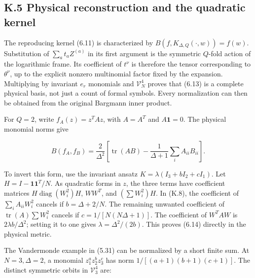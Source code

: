 \documentclass[a4paper,11pt]{article}
\numberwithin{equation}{section}
\begin{document}
\hypertarget{k.5-physical-reconstruction-and-the-quadratic-kernel}{%
\subsection{K.5 Physical reconstruction and the quadratic kernel}\label{k.5-physical-reconstruction-and-the-quadratic-kernel}}

The reproducing kernel (6.11) is characterized by \(B(f,K_{\Delta,Q}(\cdot,w))=f(w)\). Substitution of \(\sum_at_aZ^{(a)}\) in its first argument is the symmetric \(Q\)-fold action of the logarithmic frame. Its coefficient of \(t^\nu\) is therefore the tensor corresponding to \(\theta^\nu\), up to the explicit nonzero multinomial factor fixed by the expansion. Multiplying by invariant \(e_r\) monomials and \(\mathcal V_N^4\) proves that (6.13) is a complete physical basis, not just a count of formal symbols. Every normalization can then be obtained from the original Bargmann inner product.

For \(Q=2\), write \(f_A(z)=z^TAz\), with \(A=A^T\) and \(A\mathbf1=0\). The physical monomial norms give

\[
B(f_A,f_B)=\frac2{\Delta^2}
\left[\operatorname{tr}(AB)-\frac1{\Delta+1}\sum_iA_{ii}B_{ii}\right].
\tag{K.8}
\]

To invert this form, use the invariant ansatz \(K=\lambda(I_3+bI_2+cI_1)\). Let \(H=I-\mathbf1\mathbf1^T/N\). As quadratic forms in \(z\), the three terms have coefficient matrices \(H\operatorname{diag}(W_i^2)H\), \(WW^T\), and \((\sum W_i^2)H\). In (K.8), the coefficient of \(\sum_iA_{ii}W_i^2\) cancels if \(b=\Delta+2/N\). The remaining unwanted coefficient of \(\operatorname{tr}(A)\sum W_i^2\) cancels if \(c=1/[N(N\Delta+1)]\). The coefficient of \(W^TAW\) is \(2\lambda b/\Delta^2\); setting it to one gives \(\lambda=\Delta^2/(2b)\). This proves (6.14) directly in the physical metric.

The Vandermonde example in (5.31) can be normalized by a short finite sum. At \(N=3,\Delta=2\), a monomial \(z_1^{a}z_2^{b}z_3^{c}\) has norm \(1/[(a+1)(b+1)(c+1)]\). The distinct symmetric orbits in \(\mathcal V_3^4\) are:
\end{document}
